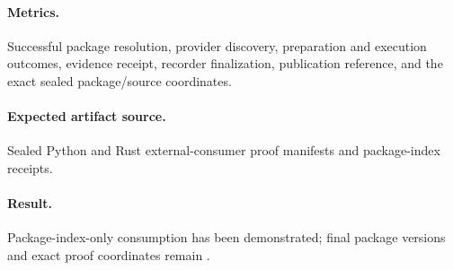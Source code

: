 \paragraph{Metrics.} Successful package resolution, provider discovery,
preparation and execution outcomes, evidence receipt, recorder finalization,
publication reference, and the exact sealed package/source coordinates.

\paragraph{Expected artifact source.} Sealed Python and Rust external-consumer
proof manifests and package-index receipts.

\paragraph{Result.} Package-index-only consumption has been demonstrated;
final package versions and exact proof coordinates remain
\TBAPackageProofCoordinates.
